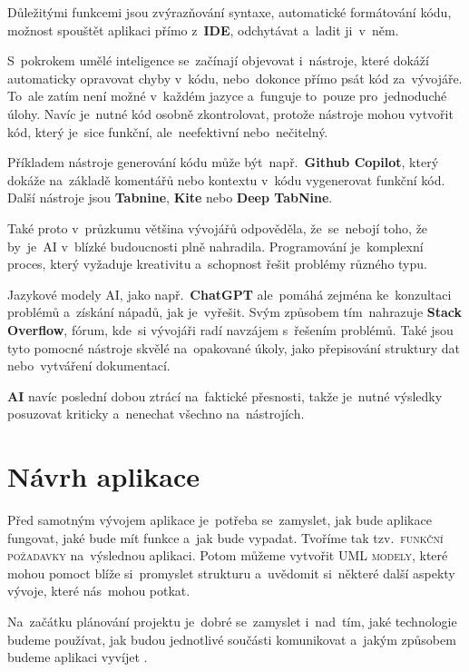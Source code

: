 \documentclass[14pt,a4paper]{article}
\begin{document}
        Důležitými funkcemi jsou zvýrazňování syntaxe, automatické formátování kódu, možnost spouštět aplikaci přímo z~\textbf{IDE}, odchytávat a~ladit ji~v~něm.
        
        S~pokrokem umělé inteligence se~začínají objevovat i~nástroje, které dokáží automaticky opravovat chyby v~kódu, nebo~dokonce přímo psát kód za~vývojáře. To~ale zatím není možné v~každém jazyce a~funguje to~pouze pro~jednoduché úlohy. Navíc je~nutné kód osobně zkontrolovat, protože nástroje mohou vytvořit kód, který je~sice funkční, ale~neefektivní nebo~nečitelný.

        Příkladem nástroje generování kódu může být~např.~\textbf{Github Copilot}, který dokáže na~základě komentářů nebo kontextu v~kódu vygenerovat funkční kód. Další nástroje jsou \textbf{Tabnine}, \textbf{Kite} nebo \textbf{Deep TabNine}.
        
        Také proto v~průzkumu \parencite{zerotomasteryStateOfAI} většina vývojářů odpověděla, že~se~nebojí toho, že by~je~\textsc{AI} v~blízké budoucnosti plně nahradila. Programování je~komplexní proces, který vyžaduje kreativitu a~schopnost řešit problémy různého typu.
        
        Jazykové modely \textsc{AI}, jako např.~\textbf{ChatGPT} ale~pomáhá zejména ke~konzultaci problémů a~získání nápadů, jak je~vyřešit. Svým způsobem tím~nahrazuje \textbf{Stack Overflow}, fórum, kde~si vývojáři radí navzájem s~řešením problémů. Také jsou tyto pomocné nástroje skvělé na~opakované úkoly, jako přepisování struktury dat nebo~vytváření dokumentací.

        \textbf{AI} navíc poslední dobou ztrácí na~faktické přesnosti, takže je~nutné výsledky posuzovat kriticky a~nenechat všechno na~nástrojích.

	\section{Návrh aplikace}
        Před samotným vývojem aplikace je~potřeba se~zamyslet, jak bude aplikace fungovat, jaké bude mít funkce a~jak bude vypadat. Tvoříme tak tzv.~\textsc{funkční požadavky} na~výslednou aplikaci. Potom můžeme vytvořit \textsc{UML modely}, které mohou pomoct blíže si~promyslet strukturu a~uvědomit si~některé další aspekty vývoje, které nás~mohou potkat.

        Na~začátku plánování projektu je~dobré se~zamyslet i~nad~tím, jaké technologie budeme používat, jak budou jednotlivé součásti komunikovat a~jakým způsobem budeme aplikaci vyvíjet \parencite{bctynovsky:specifikacepozadavku}.
    
\end{document}
